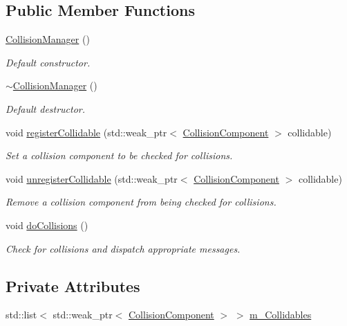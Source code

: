 \subsection*{Public Member Functions}
\begin{DoxyCompactItemize}
\item 
\hyperlink{class_collision_manager_a81f0b3f0cc0268c80f54714cd7ddb55f}{Collision\+Manager} ()
\begin{DoxyCompactList}\small\item\em Default constructor. \end{DoxyCompactList}\item 
\hyperlink{class_collision_manager_acdbb3c842f0ef1c7a028d3f080855766}{$\sim$\+Collision\+Manager} ()
\begin{DoxyCompactList}\small\item\em Default destructor. \end{DoxyCompactList}\item 
void \hyperlink{class_collision_manager_ac25d21cc6d3b44fc6b2fcc1dca9ca3f7}{register\+Collidable} (std\+::weak\+\_\+ptr$<$ \hyperlink{class_collision_component}{Collision\+Component} $>$ collidable)
\begin{DoxyCompactList}\small\item\em Set a collision component to be checked for collisions. \end{DoxyCompactList}\item 
void \hyperlink{class_collision_manager_ad54a09438c86f207fe69694fb49a15d4}{unregister\+Collidable} (std\+::weak\+\_\+ptr$<$ \hyperlink{class_collision_component}{Collision\+Component} $>$ collidable)
\begin{DoxyCompactList}\small\item\em Remove a collision component from being checked for collisions. \end{DoxyCompactList}\item 
void \hyperlink{class_collision_manager_ab10987e9a5f454973aa5eec45229d17a}{do\+Collisions} ()
\begin{DoxyCompactList}\small\item\em Check for collisions and dispatch appropriate messages. \end{DoxyCompactList}\end{DoxyCompactItemize}
\subsection*{Private Attributes}
\begin{DoxyCompactItemize}
\item 
std\+::list$<$ std\+::weak\+\_\+ptr$<$ \hyperlink{class_collision_component}{Collision\+Component} $>$ $>$ \hyperlink{class_collision_manager_a1e8ca739d58f92f5bae1d4dea802adcc}{m\+\_\+\+Collidables}
\end{DoxyCompactItemize}


